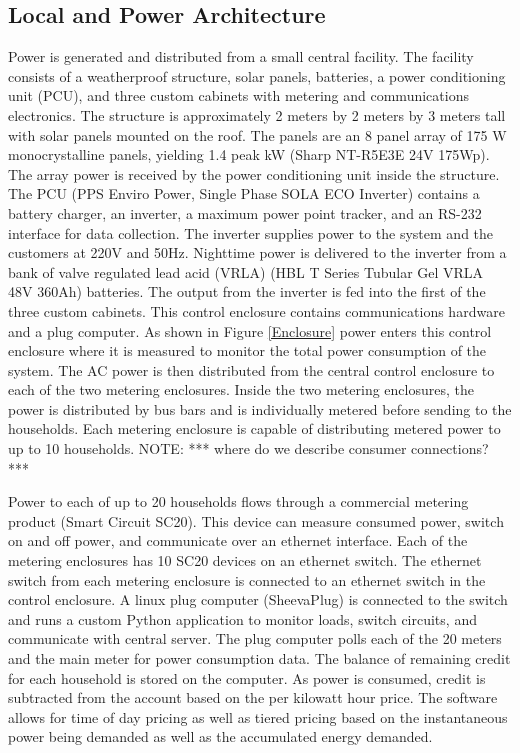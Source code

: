 \documentclass[conference]{IEEEtran}
\newcommand{\note}[1]{{\color{red} NOTE: *** #1 ***}}
\begin{document}
\subsection{Local and Power Architecture}
Power is generated and distributed from a small central facility.
The facility consists of a weatherproof structure, solar panels, 
batteries, a power conditioning unit (PCU), and three custom
cabinets with metering and communications electronics.
The structure is approximately 2 meters by 2 meters 
by 3 meters tall with solar panels mounted on the roof.
The panels are an 8 panel array of 175 W monocrystalline panels, yielding
1.4 peak kW (Sharp NT-R5E3E 24V 175Wp).
The array power is received by the power conditioning unit 
inside the structure.  The PCU (PPS Enviro Power, Single Phase SOLA ECO Inverter)
contains a battery charger, an inverter, a maximum power point 
tracker, and an RS-232 interface for data collection.  
The inverter supplies power to the system and the 
customers at 220V and 50Hz.  Nighttime power is delivered to the
inverter from
a bank of valve regulated lead acid (VRLA) 
(HBL T Series Tubular Gel VRLA 48V 360Ah) batteries.  
The output from the inverter is fed into the first of the three custom
cabinets.  This control enclosure contains communications hardware and
a plug computer.
As shown in 
Figure \ref{Enclosure} power enters this control enclosure where it 
is measured to monitor the total power consumption of the system.
The AC power is then distributed from the central 
control enclosure to each of the two metering enclosures.  
Inside the two
metering enclosures, the power is distributed by bus bars and is 
individually metered before sending to the households.  Each metering
enclosure is capable of distributing metered power to up to 10 households.
\note{where do we describe consumer connections?}

Power to each of up to 20 households flows through a commercial metering
product (Smart Circuit SC20).  This device can measure consumed power, 
switch on and off power, and communicate over an ethernet interface.
Each of the metering enclosures has 10 SC20 devices on an ethernet switch.
The ethernet switch from each metering enclosure is connected to an 
ethernet switch in the control enclosure.
A linux plug computer (SheevaPlug) is connected to the switch and runs 
a custom Python application to monitor loads, switch circuits, and communicate
with central server.
The plug computer polls each of the 20 meters and the main meter for power consumption data.
The balance of remaining credit for each household is stored on the computer.
As power is consumed, credit is subtracted from the account based on the 
per kilowatt hour price.
The software
allows for time of day pricing as well as tiered pricing based on
the instantaneous power being demanded as well as the accumulated energy
demanded.  
\end{document}
